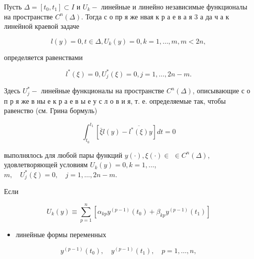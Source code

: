 \documentclass[10pt]{article}
\begin{document}
Пусть $\Delta=\left[t_{0}, t_{1}\right] \subset I$ и $U_{k}-$ линейные и линейно независимые функционалы на пространстве $C^{n}(\Delta)$. Тогда с о пр я же нвая к р а е в а я 3 а да ч а к линейной краевой задаче



\[

l(y)=0, t \in \Delta, U_{k}(y)=0, k=1, \ldots, m, m<2 n,

\]



определяется равенствами



\[

l^{*}(\xi)=0, U_{j}^{*}(\xi)=0, j=1, \ldots, 2 n-m .

\]



Здесь $U_{j}^{*}-$ линейные функционалы на пространстве $C^{n}(\Delta)$, описывающие с о п р я же в ны е к р а е в ы е у с л о в и я, т. е. определяемые так, чтобы равенство (см. Грина бормуль)



\[

\int_{t_{0}}^{t_{1}}\left[\bar{\xi} l(y)-\overline{l^{*}(\xi)} y\right] d t=0

\]



выполнялось для любой пары функций $y(\cdot), \xi(\cdot) \in$ $\in C^{n}(\Delta)$, удовлетворяющей условиям $U_{k}(y)=0, k=1, \ldots$, $m, \quad U_{j}^{*}(\xi)=0, \quad j=1, \ldots, 2 n-m$.



Если



\[

U_{k}(y) \equiv \sum_{p=1}^{n}\left[\alpha_{k p} y^{(p-1)}\left(t_{0}\right)+\beta_{k p} y^{(p-1)}\left(t_{1}\right)\right]

\]



\begin{itemize}

  \item линейные формы переменных

\end{itemize}



\[

y^{(p-1)}\left(t_{0}\right), \quad y^{(p-1)}\left(t_{1}\right), \quad p=1, \ldots, n,

\]
\end{document}
